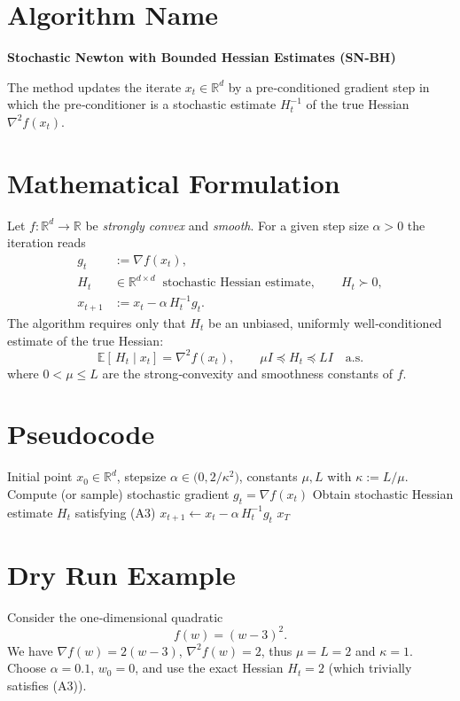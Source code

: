 \documentclass{article}
\newcommand{\E}{\mathbb{E}}
\newcommand{\R}{\mathbb{R}}
\begin{document}
\section*{Algorithm Name}
\textbf{Stochastic Newton with Bounded Hessian Estimates (SN‑BH)}  

The method updates the iterate $x_t\in\R^{d}$ by a pre‑conditioned gradient step
in which the pre‑conditioner is a stochastic estimate $H_t^{-1}$ of the true
Hessian $\nabla^{2}f(x_t)$.  

\section*{Mathematical Formulation}
Let $f:\R^{d}\rightarrow\R$ be \emph{strongly convex} and \emph{smooth}.  
For a given step size $\alpha>0$ the iteration reads
\begin{align}
   g_t &:= \nabla f(x_t) , \label{eq:grad}\\
   H_t &\in\R^{d\times d}\ \text{ stochastic Hessian estimate},\qquad 
          H_t \succ 0, \label{eq:hessian}\\
   x_{t+1} &:= x_t - \alpha\, H_t^{-1} g_t . \label{eq:update}
\end{align}
The algorithm requires only that $H_t$ be an unbiased, uniformly
well‑conditioned estimate of the true Hessian:
\[
   \E\!\left[\,H_t\mid x_t\right]=\nabla^{2}f(x_t),\qquad
   \mu I \preceq H_t \preceq L I\quad\text{a.s.} \tag{A3}
\]
where $0<\mu\le L$ are the strong‑convexity and smoothness constants of $f$.

\section*{Pseudocode}
\begin{algorithm}[H]
\caption{SN‑BH}
\begin{algorithmic}[1]
\Require Initial point $x_0\in\R^{d}$, stepsize $\alpha\in\bigl(0,2/\kappa^{2}\bigr)$,
        constants $\mu,L$ with $\kappa:=L/\mu$.
    \State Compute (or sample) stochastic gradient $g_t=\nabla f(x_t)$
    \State Obtain stochastic Hessian estimate $H_t$ satisfying (A3)
    \State $x_{t+1}\gets x_t-\alpha\,H_t^{-1}g_t$
\EndFor
\State \Return $x_T$
\end{algorithmic}
\end{algorithm}

\section*{Dry Run Example}
Consider the one‑dimensional quadratic
\[
   f(w)=(w-3)^2 .
\]
We have $\nabla f(w)=2(w-3)$, $\nabla^{2}f(w)=2$, thus $\mu=L=2$ and $\kappa=1$.  
Choose $\alpha=0.1$, $w_0=0$, and use the exact Hessian $H_t=2$ (which trivially satisfies (A3)).  
\end{document}
